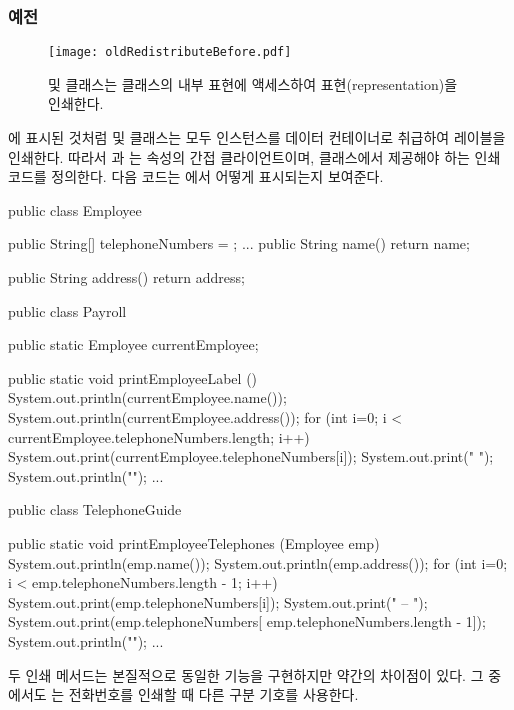 \documentclass[a4paper,10pt,twoside]{book}
\begin{document}
\subsubsection*{예전}

\begin{figure}
\begin{center}
\texttt{[image: oldRedistributeBefore.pdf]}
\caption{ 및  클래스는  클래스의 내부 표현에 액세스하여 표현(representation)을 인쇄한다.}
\end{center}
\end{figure}

에 표시된 것처럼  및  클래스는 모두  인스턴스를 데이터 컨테이너로 취급하여 레이블을 인쇄한다. 따라서 과 는  속성의 간접 클라이언트이며,  클래스에서 제공해야 하는 인쇄 코드를 정의한다. 다음 코드는 에서 어떻게 표시되는지 보여준다.

\begin{code}
public class Employee {
	public String[] telephoneNumbers = {};
	...
	public String name() {
		return name;}
	
	public String address() {
		return address;}
}

public class Payroll {

	public static Employee currentEmployee;

	public static void printEmployeeLabel () {
		System.out.println(currentEmployee.name());
		System.out.println(currentEmployee.address());
		for (int i=0; i < currentEmployee.telephoneNumbers.length; i++) {
			System.out.print(currentEmployee.telephoneNumbers[i]);
			System.out.print(" ");}
		System.out.println("");}
...
}

public class TelephoneGuide {

	public static void printEmployeeTelephones (Employee emp) {
		System.out.println(emp.name());
		System.out.println(emp.address());
		for (int i=0; i < emp.telephoneNumbers.length - 1; i++) {
			System.out.print(emp.telephoneNumbers[i]);
			System.out.print(" -- ");}
		System.out.print(emp.telephoneNumbers[
				emp.telephoneNumbers.length - 1]);
		System.out.println("");}
	...
}
\end{code}

두 인쇄 메서드는 본질적으로 동일한 기능을 구현하지만 약간의 차이점이 있다. 그 중에서도 는 전화번호를 인쇄할 때 다른 구분 기호를 사용한다.
\end{document}
